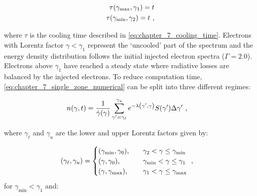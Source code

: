 \begin{equation}
    \begin{aligned}
    \tau\qty(\gamma_\text{max},\gamma_1) = t \\
    \tau\qty(\gamma_\text{min}, \gamma_2) = t\text{ ,}
    \end{aligned} \label{eq:chapter_7_gamma1_gamma2}
\end{equation}

\noindent where $\tau$ is the cooling time described in \autoref{eq:chapter_7_cooling_time}. Electrons with Lorentz factor $\gamma<\gamma_1$ represent the `uncooled' part of the spectrum and the energy density distribution follows the initial injected electron spectra ($\Gamma=2.0$). Electrons above $\gamma_1$ have reached a steady state where radiative losses are balanced by the injected electrons. To reduce computation time, \autoref{eq:chapter_7_single_zone_numerical} can be split into three different regimes:

\begin{equation}
    \begin{aligned}
    n\qty(\gamma,t)&=\frac{1}{\dot{\gamma}\qty(\gamma)}\sum_{\gamma'=\gamma_\ell}^{\gamma_u} e^{-\lambda\qty(\gamma',\gamma)}S\qty(\gamma')\Delta \gamma'\text{ ,}
    \end{aligned}  \label{eq:chapter_7_single_zone_numerical_manolakou}
\end{equation}

\noindent where $\gamma_\ell$ and $\gamma_u$ are the lower and upper Lorentz factors given by:

\begin{equation}
    \begin{aligned}
  	  \qty(\gamma_\ell,\gamma_u)&=
  	  \begin{cases}
  		  \qty(\gamma_\text{min},\gamma_0)\text{,}\quad & \gamma_2<\gamma\leq\gamma_\text{min} \\
  		  \qty(\gamma,\gamma_0)\text{,}\quad & \gamma_\text{min}<\gamma\leq\gamma_1 \\
		    \qty(\gamma,\gamma_\text{max})\text{,}\quad & \gamma_1<\gamma\leq\gamma_\text{max}
   	 \end{cases}\text{ ,}
    \end{aligned}
\end{equation}
\noindent for $\gamma_\text{min}<\gamma_1$ and:

